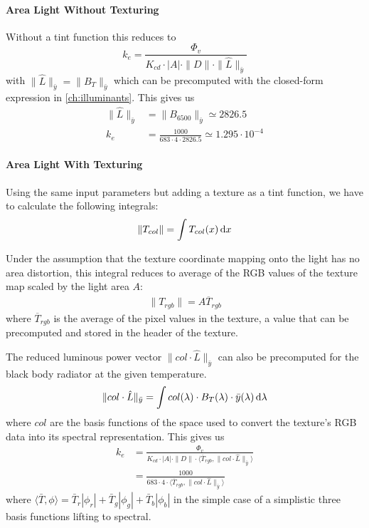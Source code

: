 \paragraph{Area Light Without Texturing} Without a tint function this reduces to
\begin{displaymath}
k_e = \frac{\Phi_v}{K_{cd} \cdot |A| \cdot \|D\| \cdot \|\hat{L}\|_{\bar y} }
\end{displaymath}
with $\|\hat{L}\|_{\bar y} = \|B_T\|_{\bar y}$ which can be precomputed with the
closed-form expression in \cref{ch:illuminants}. This gives us
\begin{align*}
\|\hat{L}\|_{\bar y} &= \|B_{6500}\|_{\bar y} \simeq 2826.5 \\
k_e &= \frac{1000}{683 \cdot 4 \cdot 2826.5 } \simeq 1.295 \cdot 10^{-4}
\end{align*}

\paragraph{Area Light With Texturing}
Using the same input parameters but adding a texture as a tint function,
we have to calculate the following integrals:
\begin{displaymath}
\|T_{col}\| = \int T_{col}(x) \mathop{}\!\mathrm{d} x
\end{displaymath}

Under the assumption that the texture coordinate mapping onto the light has no area
distortion, this integral reduces to average of the \gls{RGB} values of the
texture map scaled by the light area $A$:
\begin{align*}
\|T_{rgb}\| = A \overline{T}_{rgb}
\end{align*}
where $\overline{T}_{rgb}$ is the average of the pixel values in the
texture,
a value that can be precomputed and stored in the header of the texture.

The reduced luminous power vector $\|col\cdot \hat L\|_{\bar y}$ can also
be precomputed for the black body radiator at the given temperature.
\begin{displaymath}
\|col\cdot \hat L\|_{\bar y} = \int col(\lambda) \cdot B_T(\lambda) \cdot \bar y
(\lambda) \mathop{}\!\mathrm{d}\lambda
\end{displaymath}
where $col$ are the basis functions of the space used to convert the texture's
\gls{RGB} data into its spectral representation.
This gives us
\begin{align*}
 k_e &= \frac{\Phi_v}{K_{cd} \cdot |A| \cdot \|D\| \cdot \langle \overline{T}_{rgb}, \|col\cdot\hat{L}\|_{\bar y} \rangle } \\
&= \frac{1000}{683 \cdot 4 \cdot \langle \overline{T}_{rgb}, \|col\cdot\hat{L}\|_{\bar y} \rangle  }
\end{align*}
where $\langle \bar T, \phi \rangle = \bar T_r|\phi_r| + \bar T_g|\phi_g| + \bar T_b|\phi_b| $
in the simple case of a simplistic three basis functions lifting to spectral.

